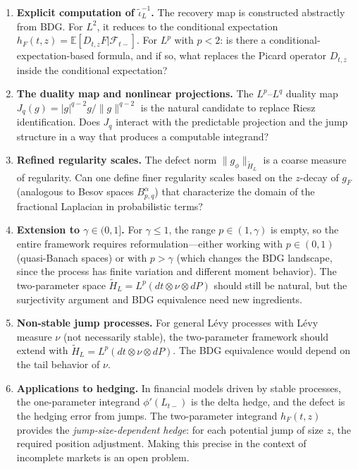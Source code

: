 \documentclass[11pt,a4paper]{article}
\theoremstyle{plain}
\theoremstyle{definition}
\theoremstyle{remark}
\newcommand{\E}{\mathbb{E}}
\begin{document}
\begin{enumerate}[label=(\roman*)]
\item \textbf{Explicit computation of
$\widetilde{\iota}_L^{-1}$.}
The recovery map is constructed abstractly from BDG.
For $L^2$, it reduces to the conditional expectation
$h_F(t,z) = \E[D_{t,z}F|\mathcal{F}_{t-}]$.  For
$L^p$ with $p < 2$: is there a conditional-expectation-based
formula, and if so, what replaces the Picard operator $D_{t,z}$
inside the conditional expectation?

\item \textbf{The duality map and nonlinear projections.}
The $L^p$--$L^q$ duality map
$J_q(g) = |g|^{q-2}g/\|g\|^{q-2}$ is the natural
candidate to replace Riesz identification.  Does $J_q$ interact
with the predictable projection and the jump structure in a way
that produces a computable integrand?

\item \textbf{Refined regularity scales.}
The defect norm $\|g_\phi\|_{\widetilde{H}_L}$ is a
coarse measure of regularity.  Can one define finer
regularity scales based on the $z$-decay of $g_F$
(analogous to Besov spaces $B^\alpha_{p,q}$) that
characterize the domain of the fractional Laplacian
in probabilistic terms?

\item \textbf{Extension to $\gamma \in (0,1]$.}
For $\gamma \leq 1$, the range $p \in (1,\gamma)$ is empty,
so the entire framework requires reformulation---either
working with $p \in (0,1)$ (quasi-Banach spaces) or with
$p > \gamma$ (which changes the BDG landscape, since the
process has finite variation and different moment behavior).
The two-parameter space
$\widetilde{H}_L = L^p(dt\otimes\nu\otimes dP)$ should
still be natural, but the surjectivity argument and
BDG equivalence need new ingredients.

\item \textbf{Non-stable jump processes.}
For general L\'evy processes with L\'evy measure $\nu$
(not necessarily stable), the two-parameter framework
should extend with $\widetilde{H}_L =
L^p(dt\otimes\nu\otimes dP)$.  The BDG equivalence
would depend on the tail behavior of $\nu$.

\item \textbf{Applications to hedging.}
In financial models driven by stable processes, the
one-parameter integrand $\phi'(L_{t-})$ is the delta hedge,
and the defect is the hedging error from jumps.  The
two-parameter integrand $h_F(t,z)$ provides the
\emph{jump-size-dependent hedge}: for each potential jump
of size $z$, the required position adjustment.  Making
this precise in the context of incomplete markets is an
open problem.
\end{enumerate}
\end{document}
